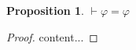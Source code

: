 \documentclass{article}
\newcommand{\imp}{\rightarrow}
\newcommand{\dimp}{\leftrightarrow}
\DeclarePairedDelimiter\ceil{\lceil}{\rceil}
\newtheorem{prop}{Proposition}
\begin{document}
\begin{prop}
	$\vdash \varphi = \varphi$
\end{prop}
\begin{proof}
	content...
\end{proof}


\end{document}
